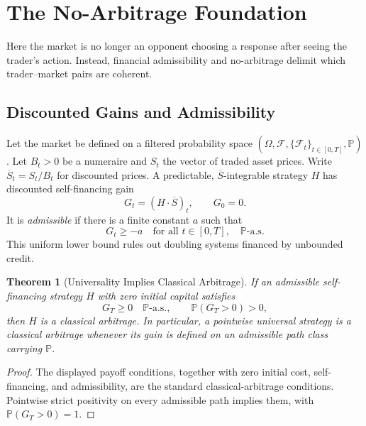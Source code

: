 \documentclass[aps,pra,reprint,superscriptaddress,amsmath,amssymb,floatfix]{revtex4-2}
\theoremstyle{plain}
\newtheorem{theorem}{Theorem}
\theoremstyle{definition}
\theoremstyle{remark}
\begin{document}
\section{The No-Arbitrage Foundation}
\label{sec:noarb}

Here the market is no longer an opponent choosing a response after seeing the
trader's action. Instead, financial admissibility and no-arbitrage delimit
which trader--market pairs are coherent.

\subsection{Discounted Gains and Admissibility}

Let the market be defined on a filtered probability space
\((\Omega,\mathcal{F},\{\mathcal{F}_t\}_{t\in[0,T]},\mathbb{P})\).
Let \(B_t>0\) be a numeraire and \(S_t\) the vector of traded asset prices.
Write \(\overline S_t=S_t/B_t\) for discounted prices. A predictable,
\(\overline S\)-integrable strategy \(H\) has discounted self-financing gain
\begin{equation}
  G_t=(H\mathbin{\cdot}\overline S)_t,\qquad G_0=0.
  \label{eq:gain}
\end{equation}
It is \emph{admissible} if there is a finite constant \(a\) such that
\begin{equation}
  G_t\geq -a\quad\text{for all }t\in[0,T],\quad\mathbb{P}\text{-a.s.}
  \label{eq:admissible}
\end{equation}
This uniform lower bound rules out doubling systems financed by unbounded
credit.

\begin{theorem}[Universality Implies Classical Arbitrage]
  \label{thm:arbitrage}
  If an admissible self-financing strategy \(H\) with zero initial capital
  satisfies
  \[
    G_T\geq0\quad\mathbb{P}\text{-a.s.},
    \qquad
    \mathbb{P}(G_T>0)>0,
  \]
  then \(H\) is a classical arbitrage. In particular, a pointwise universal
  strategy is a classical arbitrage whenever its gain is defined on an
  admissible path class carrying \(\mathbb{P}\).
\end{theorem}

\begin{proof}
The displayed payoff conditions, together with zero initial cost,
self-financing, and admissibility, are the standard classical-arbitrage
conditions. Pointwise strict positivity on every admissible path implies them,
with \(\mathbb{P}(G_T>0)=1\).
\end{proof}
\end{document}
